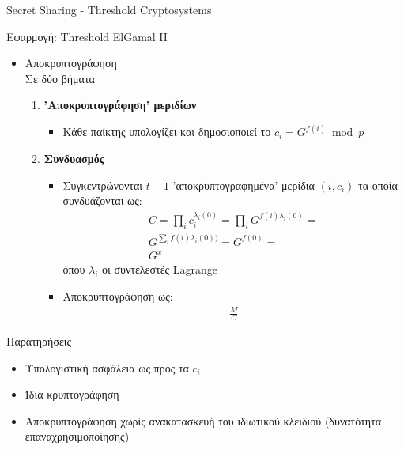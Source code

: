 \documentclass[handout]{beamer}
\begin{document}
\begin{section}{Secret Sharing - Threshold Cryptosystems}
\begin{frame}{Εφαρμογή: Threshold ElGamal II}
\begin{itemize}
\item Αποκρυπτογράφηση \\
Σε δύο βήματα

\begin{enumerate}
\item \textbf{'Αποκρυπτογράφηση' μεριδίων}
\begin{itemize}
\item Κάθε παίκτης υπολογίζει και δημοσιοποιεί το $c_i=G^{f(i)} \bmod p$
\end{itemize}
\item \textbf{Συνδυασμός}
\begin{itemize}
\item Συγκεντρώνονται $t+1$ 'αποκρυπτογραφημένα' μερίδια $(i,c_i)$ τα οποία συνδυάζονται ως: \pause
\begin{align*}
C = \prod_i c_i ^ {\lambda_i(0)} = \prod_i G ^ {f(i) \lambda_i(0)} = \\
G ^ {\sum_i f(i) \lambda_i(0))} = G^{f(0)} = \\ G^x
\end{align*}
όπου $\lambda_i$ οι συντελεστές Lagrange \pause
\item Αποκρυπτογράφηση ως: \begin{align*}\frac{M}{C}\end{align*}
\end{itemize}
\end{enumerate}
\end{itemize}
\end{frame}

\begin{frame}{Παρατηρήσεις}
\begin{itemize}
\item Υπολογιστική ασφάλεια ως προς τα $c_i$
\pause
\item Ίδια κρυπτογράφηση
\pause
\item Αποκρυπτογράφηση χωρίς ανακατασκευή του ιδιωτικού κλειδιού (δυνατότητα επαναχρησιμοποίησης)
\end{itemize}
\end{frame}

\end{section}
\end{document}
